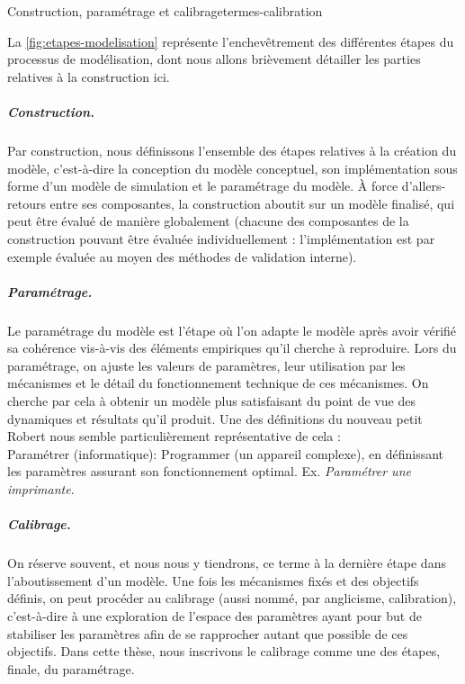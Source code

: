 \clearpage
\begin{encadre}{Construction, paramétrage et calibrage}{termes-calibration}
\renewcommand{\thempfootnote}{\alph{mpfootnote}}
	
La \cref{fig:etapes-modelisation} représente l'enchevêtrement des différentes étapes du processus de modélisation, dont nous allons brièvement détailler les parties relatives à la construction ici.
	
\subparagraph{Construction.}
Par construction, nous définissons l'ensemble des étapes relatives à la création du modèle, c'est-à-dire la conception du modèle conceptuel, son implémentation sous forme d'un modèle de simulation et le paramétrage du modèle.
À force d'allers-retours entre ses composantes, la construction aboutit sur un modèle \og finalisé\fg{}, qui peut être évalué de manière globalement (chacune des composantes de la construction pouvant être évaluée individuellement : l'implémentation est par exemple évaluée au moyen des méthodes de validation interne).\vspace{-1em}
		
\subparagraph{Paramétrage.}
Le paramétrage du modèle est l'étape où l'on adapte le modèle après avoir vérifié sa cohérence vis-à-vis des éléments empiriques qu'il cherche à reproduire.
Lors du paramétrage, on ajuste les valeurs de paramètres, leur utilisation par les mécanismes et le détail du fonctionnement technique de ces mécanismes.
On cherche par cela à obtenir un modèle plus satisfaisant du point de vue des dynamiques et résultats qu'il produit.
Une des définitions du nouveau petit Robert \autocite{robert_nouveau_1993} nous semble particulièrement représentative de cela :\\
\og Paramétrer (informatique): \og Programmer (un appareil complexe), en définissant les paramètres assurant son fonctionnement optimal.
Ex. \textit{Paramétrer une imprimante}\fg{}.
\vspace{-1em}
		
\subparagraph{Calibrage.}
On réserve souvent, et nous nous y tiendrons, ce terme à la dernière étape dans l'aboutissement d'un modèle.
Une fois les mécanismes fixés et des objectifs définis, on peut procéder au calibrage (aussi nommé, par anglicisme, \og calibration\fg{}), c'est-à-dire à une exploration de l'espace des paramètres ayant pour but de stabiliser les paramètres afin de se rapprocher autant que possible de ces objectifs.
Dans cette thèse, nous inscrivons le calibrage comme une des étapes, finale, du paramétrage.\vspace{-1em}
	

\end{encadre}
